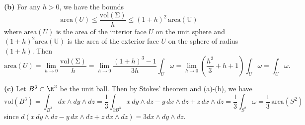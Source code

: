 \documentclass[11pt,letterpaper]{article}
\begin{document}
\begin{solution}
    \textbf{(b)} For any $h>0$, we have the bounds
    \[
        \mathrm{area}(U)\leq \frac{\mathrm{vol(\Sigma)}}{h} \leq (1+h)^2\,\mathrm{area(U)}
    \] 
    where $\mathrm{area}(U)$ is the area of the interior face $U$ on the unit sphere and $(1+h)^2\mathrm{area(U)}$ is the area of the exterior face $U$ on the sphere of radius $(1+h)$. Then
    \[
        \mathrm{area}(U) = \lim_{h\to 0}\frac{\mathrm{vol(\Sigma)}}{h}=\lim_{h\to 0}\frac{(1+h)^3-1}{3h}\int_U\omega=\lim_{h\to 0}\left(\frac{h^2}{3}+h+1\right)\int_U\omega= \int_U \omega
    .\] 

    \textbf{(c)} Let $B^3\subset \R^3$ be the unit ball. Then by Stokes' theorem and (a)-(b), we have
    \[
        \mathrm{vol}(B^3)=\int_{B^3} dx\wedge dy\wedge dz  = \frac{1}{3}\int_{\partial B^3}x\,dy\wedge dz-y\,dx\wedge dz+z\,dx\wedge dz = \frac{1}{3}\int_{S^2}\omega = \frac{1}{3}\,\mathrm{area}(S^2)
    \]
    since $d(x\,dy\wedge dz-y\,dx\wedge dz+z\,dx\wedge dz)=3dx\wedge dy\wedge dz$.  
    

\end{solution}
\end{document}
